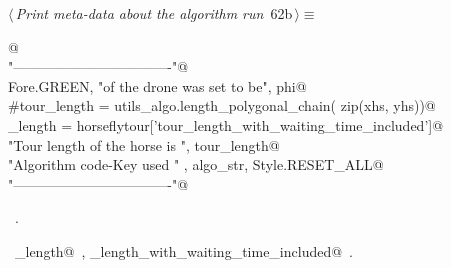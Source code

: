 \documentclass[11.5pt]{report}
\begin{document}
\vspace{-0.8cm} \newchunk
\begin{flushleft} \small
\begin{minipage}{\linewidth}\label{scrap89}\raggedright\small
{} $\langle\,${\itshape Print meta-data about the algorithm run}\nobreak\ {\footnotesize {62b}}$\,\rangle\equiv$
\vspace{-1ex}
\begin{list}{}{} \item
\mbox{}\verb@   @\\
\mbox{}\verb@print "----------------------------------"@\\
\mbox{}\verb@print Fore.GREEN, "\nSpeed of the drone was set to be", phi@\\
\mbox{}\verb@#tour_length = utils_algo.length_polygonal_chain( zip(xhs, yhs))@\\
\mbox{}\verb@tour_length = horseflytour['tour_length_with_waiting_time_included']@\\
\mbox{}\verb@print "Tour length of the horse is ",  tour_length@\\
\mbox{}\verb@print "Algorithm code-Key used "    , algo_str, Style.RESET_ALL@\\
\mbox{}\verb@print "----------------------------------\n"@\\
\mbox{}\verb@@{\NWsep}
\end{list}
\vspace{-1.5ex}
\footnotesize
\begin{list}{}{\setlength{\itemsep}{-\parsep}\setlength{\itemindent}{-\leftmargin}}
\item \NWtxtMacroRefIn\ .
\item \NWtxtIdentsUsed\nobreak\  \verb@tour_length@\nobreak\ , \verb@tour_length_with_waiting_time_included@\nobreak\ .
\item{}
\end{list}
\end{minipage}\vspace{4ex}
\end{flushleft}
\end{document}

